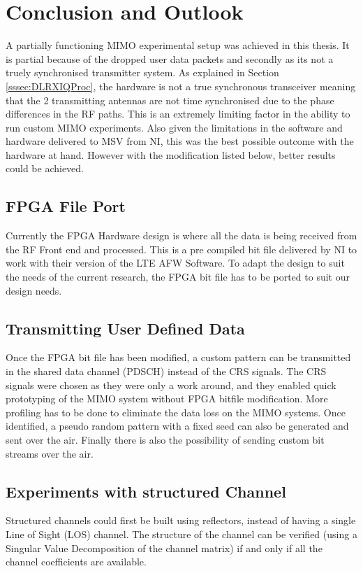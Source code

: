 \chapter{Conclusion and Outlook}\label{ch:conOutlook}

A partially functioning MIMO experimental setup was achieved in this thesis. It is partial because of the dropped user data packets and secondly as its not a truely synchronised transmitter system. As explained in Section \ref{sssec:DLRXIQProc}, the hardware is not a true synchronous transceiver meaning that the 2 transmitting antennas are not time synchronised due to the phase differences in the RF paths. This is an extremely limiting factor in the ability to run custom MIMO experiments. Also given the limitations in the software and hardware delivered to MSV from NI, this was the best possible outcome with the hardware at hand. However with the modification listed below, better results could be achieved.

\section{FPGA File Port}\label{sec:FPGAChange}
Currently the FPGA Hardware design is where all the data is being received from the RF Front end and processed. This is a pre compiled bit file delivered by NI to work with their version of the LTE AFW Software. To adapt the design to suit the needs of the current research, the FPGA bit file has to be ported to suit our design needs.

\section{Transmitting User Defined Data}\label{sec:TransUserDefData}
Once the FPGA bit file has been modified, a custom pattern can be transmitted in the shared data channel (PDSCH) instead of the CRS signals. The CRS signals were chosen as they were only a work around, and they enabled quick prototyping of the MIMO system without FPGA bitfile modification. More profiling has to be done to eliminate the data loss on the MIMO systems. Once identified, a pseudo random pattern with a fixed seed can also be generated and sent over the air. Finally there is also the possibility of sending custom bit streams over the air.

\section{Experiments with structured Channel}\label{sec:StrucChannel}
Structured channels could first be built using reflectors, instead of having a single Line of Sight (LOS) channel. The structure of the channel can be verified (using a Singular Value Decomposition of the channel matrix) if and only if all the channel coefficients are available.

